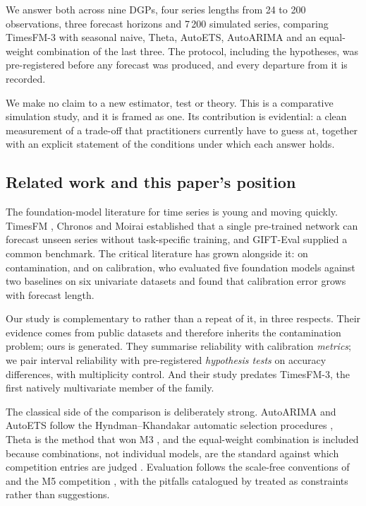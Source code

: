 \documentclass[article]{ajs}
\begin{document}
We answer both across nine DGPs, four series lengths from 24 to 200 observations, three
forecast horizons and 7\,200 simulated series, comparing TimesFM-3 with seasonal naive, Theta,
AutoETS, AutoARIMA and an equal-weight combination of the last three. The protocol, including
the hypotheses, was pre-registered before any forecast was produced, and every departure from
it is recorded.

We make no claim to a new estimator, test or theory. This is a comparative simulation study,
and it is framed as one. Its contribution is evidential: a clean measurement of a trade-off
that practitioners currently have to guess at, together with an explicit statement of the
conditions under which each answer holds.

\subsection{Related work and this paper's position}

The foundation-model literature for time series is young and moving quickly. TimesFM
\citep{das2024timesfm}, Chronos \citep{ansari2024chronos} and Moirai \citep{woo2024moirai}
established that a single pre-trained network can forecast unseen series without task-specific
training, and GIFT-Eval \citep{aksu2024gifteval} supplied a common benchmark. The critical
literature has grown alongside it: \citet{meyer2025leakage} on contamination, and
\citet{adler2026calibrated} on calibration, who evaluated five foundation models against two
baselines on six univariate datasets and found that calibration error grows with forecast
length.

Our study is complementary to \citet{adler2026calibrated} rather than a repeat of it, in three
respects. Their evidence comes from public datasets and therefore inherits the contamination
problem; ours is generated. They summarise reliability with calibration \emph{metrics}; we
pair interval reliability with pre-registered \emph{hypothesis tests} on accuracy differences,
with multiplicity control. And their study predates TimesFM-3, the first natively multivariate
member of the family.

The classical side of the comparison is deliberately strong. AutoARIMA and AutoETS follow the
Hyndman--Khandakar automatic selection procedures \citep{hyndman2008forecast,
hyndman2002statespace}, Theta is the method that won M3 \citep{assimakopoulos2000theta}, and
the equal-weight combination is included because combinations, not individual models, are the
standard against which competition entries are judged \citep{makridakis2020m4}. Evaluation
follows the scale-free conventions of \citet{hyndman2006mase} and the M5 competition
\citep{makridakis2022m5, makridakis2022m5unc}, with the pitfalls catalogued by
\citet{hewamalage2023evaluation} treated as constraints rather than suggestions.
\end{document}
